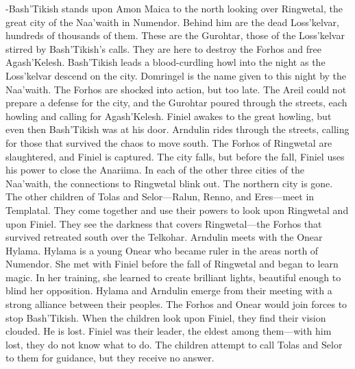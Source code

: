 \documentclass[smalldemyvopaper,11pt,twoside,onecolumn,openright,extrafontsizes]{memoir}
\begin{document}
{{-Bash’Tikish stands upon Amon Maica to the north looking over Ringwetal, the great city of the Naa’waith in Numendor. Behind him are the dead Loss’kelvar, hundreds of thousands of them. These are the Gurohtar, those of the Loss’kelvar stirred by Bash’Tikish’s calls. They are here to destroy the Forhos and free Agash’Kelesh. Bash’Tikish leads a blood-curdling howl into the night as the Loss’kelvar descend on the city. Domringel is the name given to this night by the Naa’waith. The Forhos are shocked into action, but too late. The Areil could not prepare a defense for the city, and the Gurohtar poured through the streets, each howling and calling for Agash’Kelesh. Finiel awakes to the great howling, but even then Bash’Tikish was at his door. Arndulin rides through the streets, calling for those that survived the chaos to move south. The Forhos of Ringwetal are slaughtered, and Finiel is captured. The city falls, but before the fall, Finiel uses his power to close the Anariima. In each of the other three cities of the Naa’waith, the connections to Ringwetal blink out. The northern city is gone. The other children of Tolas and Selor—Ralun, Renno, and Eres—meet in Templatal. They come together and use their powers to look upon Ringwetal and upon Finiel. They see the darkness that covers Ringwetal—the Forhos that survived retreated south over the Telkohar. Arndulin meets with the Onear Hylama. Hylama is a young Onear who became ruler in the areas north of Numendor. She met with Finiel before the fall of Ringwetal and began to learn magic. In her training, she learned to create brilliant lights, beautiful enough to blind her opposition. Hylama and Arndulin emerge from their meeting with a strong alliance between their peoples. The Forhos and Onear would join forces to stop Bash’Tikish. When the children look upon Finiel, they find their vision clouded. He is lost. Finiel was their leader, the eldest among them—with him lost, they do not know what to do. The children attempt to call Tolas and Selor to them for guidance, but they receive no answer.

}}
\end{document}
